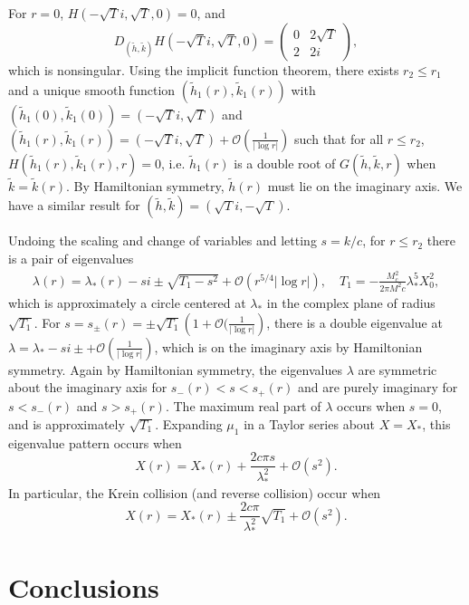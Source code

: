 \documentclass[10pt,reqno]{amsart}
\theoremstyle{plain}
\theoremstyle{definition}
\theoremstyle{remark}
\numberwithin{theorem}{section}
\numberwithin{equation}{section}
\begin{document}
For $r = 0$, $H(-\sqrt{T}i, \sqrt{T}, 0) = 0$, and
\begin{equation*}
D_{(\tilde{h}, \tilde{k})}H(-\sqrt{T}i, \sqrt{T}, 0) = 
\begin{pmatrix}
0 & 2 \sqrt{T} \\
2 & 2i
\end{pmatrix},
\end{equation*}
which is nonsingular. Using the implicit function theorem, there exists $r_2 \leq r_1$ and a unique smooth function $(\tilde{h}_1(r), \tilde{k}_1(r))$ with $(\tilde{h}_1(0), \tilde{k}_1(0)) = (-\sqrt{T}i, \sqrt{T})$ and $(\tilde{h}_1(r), \tilde{k}_1(r)) = (-\sqrt{T}i, \sqrt{T}) + \mathcal{O}(\frac{1}{|\log r|})$ such that for all $r \leq r_2$, $H(\tilde{h}_1(r), \tilde{k}_1(r), r) = 0$, i.e. $\tilde{h}_1(r)$ is a double root of $G(\tilde{h}, \tilde{k}, r)$ when $\tilde{k} = \tilde{k}(r)$. By Hamiltonian symmetry, $\tilde{h}(r)$ must lie on the imaginary axis. We have a similar result for $(\tilde{h}, \tilde{k}) = (\sqrt{T}i, -\sqrt{T})$.

Undoing the scaling and change of variables and letting $s = k/c$, for $r \leq r_2$ there is a pair of eigenvalues
\begin{align*}
\lambda(r) = \lambda_*(r) - s i \pm \sqrt{ T_1 -  s^2} + \mathcal{O}(r^{5/4}|\log r|), \quad T_1 = -\frac{M_c^2}{2 \pi M^2 c } \lambda_*^5 X_0^2,
\end{align*}
which is approximately a circle centered at $\lambda_*$ in the complex plane of radius $\sqrt{T_1}$. For $s = s_\pm(r) = \pm \sqrt{T_1}\left( 1 + \mathcal{O}(\frac{1}{|\log r|} \right)$, there is a double eigenvalue at $\lambda = \lambda_* - s i \pm + \mathcal{O}\left(\frac{1}{|\log r|} \right)$, which is on the imaginary axis by Hamiltonian symmetry. Again by Hamiltonian symmetry, the eigenvalues $\lambda$ are symmetric about the imaginary axis for $s_-(r) < s < s_+(r)$ and are purely imaginary for $s < s_-(r)$ and $s > s_+(r)$. The maximum real part of $\lambda$ occurs when $s = 0$, and is approximately $\sqrt{T_1}$. Expanding $\mu_1$ in a Taylor series about $X = X_*$, this eigenvalue pattern occurs when
\begin{equation}
X(r) = X_*(r) + \frac{2 c \pi s}{\lambda_*^2} + \mathcal{O}(s^2).
\end{equation}
In particular, the Krein collision (and reverse collision) occur when 
\[
X(r) = X_*(r) \pm \frac{2 c \pi}{\lambda_*^2}\sqrt{T_1} + \mathcal{O}(s^2).
\]

\section{Conclusions}\label{sec:conclusions}
\end{document}
